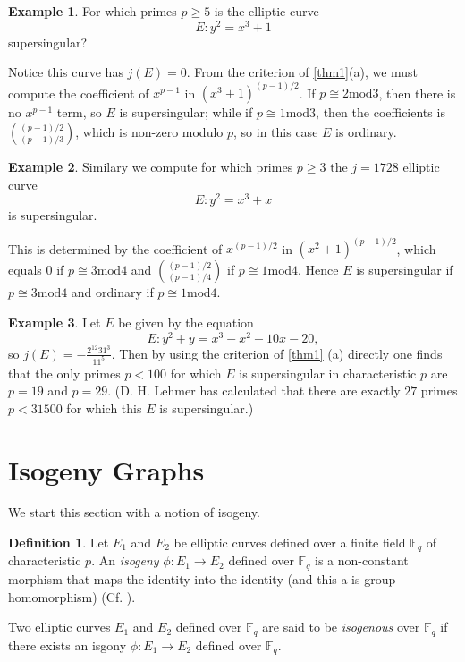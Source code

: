 \documentclass{article}
\theoremstyle{theorem}
\theoremstyle{definition}
\newtheorem{definition}{Definition}
\newtheorem{example}{Example}
\begin{document}
\begin{example}
	For which primes $p \geq 5$ is the elliptic curve
		\[E:  y^2 = x^3 + 1\]
	supersingular?
	
	Notice this curve has $j(E) = 0$. From the criterion of \cref{thm1}(a), we must compute the coefficient of $x^{p-1}$ in $(x^3 + 1)^{(p-1)/2}$. If $p \cong 2 \mathrm{mod} 3$, then there is no $x^{p-1}$ term, so $E$ is supersingular; while if $p \cong 1 \mathrm{mod} 3$, then the coefficients is $\binom{(p-1)/2}{(p-1)/3}$, which is non-zero modulo $p$, so in this case $E$ is ordinary.
\end{example}

\begin{example}
	Similary we compute for which primes $p \geq 3$ the $j = 1728$ elliptic curve
		\[E: y^2 = x^3 + x \]
	is supersingular.
	
	This is determined by the coefficient of $x^{(p-1)/2}$ in $(x^2 + 1)^{(p-1)/2}$, which equals $0$ if $p \cong 3 \mathrm{mod} 4$ and $\binom{(p-1)/2}{(p-1)/4}$ if $p \cong 1 \mathrm{mod} 4$. Hence $E$ is supersingular if $p \cong 3 \mathrm{mod} 4$ and ordinary if $p \cong 1 \mathrm{mod} 4$.
\end{example}

\begin{example}
	Let $E$ be given by the equation 
		\[E: y^2 + y = x^3 -x^2 -10x - 20,\]
	so $j(E) = -\frac{2^{12}31^3}{11^5}$. Then by using the criterion of \cref{thm1} (a) directly one finds that the only primes $p < 100$ for which $E$ is supersingular in characteristic $p$ are $p = 19$ and $p = 29$. (D. H. Lehmer has calculated that there are exactly $27$ primes $p < 31500$ for which this $E$ is supersingular.) 
\end{example}


\section{Isogeny Graphs}

We start this section with a notion of isogeny.
	\begin{definition} \label{isogeny}
		Let $E_1$ and $E_2$ be elliptic curves defined over a finite field $\mathbb{F}_q$ of characteristic $p$. An \textit{isogeny} $\phi: E_1 \to E_2$ defined over $\mathbb{F}_q$ is a non-constant morphism that maps the identity into the identity (and this a is group homomorphism) (Cf. \cite[2.1]{HardEasyProbs}).
	\end{definition}
Two elliptic curves $E_1$ and $E_2$ defined over $\mathbb{F}_q$ are said to be \textit{isogenous} over $\mathbb{F}_q$ if there exists an isgony $\phi: E_1 \to E_2$ defined over $\mathbb{F}_q$.
\end{document}
